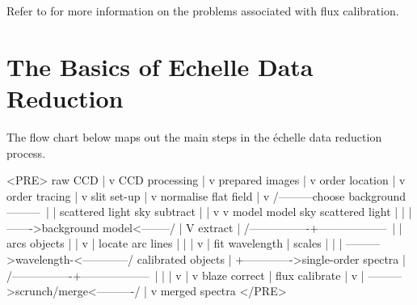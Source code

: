 Refer to  for more information on the problems associated with
flux calibration.

\section{\label{se_basics}The Basics of Echelle Data Reduction}

\begin{htmlonly}
The flow chart below maps out the main steps in the
\'{e}chelle data reduction process.
\begin{rawhtml}
<PRE>
                     raw CCD
                        |
                        v
                  CCD  processing
                        |
                        v
                  prepared images
                        |
                        v
                  order  location
                        |
                        v
                   order tracing
                        |
                        v
                    slit set-up
                        |
                        v
                     normalise
                    flat  field
                        |
                        v
       /---------choose background---------\
       |                                   |
scattered light                      sky  subtract
       |                                   |
       v                                   v
     model                             model sky
scattered light                            |
       |                                   |
       \-------->background  model<--------/
                        |
                        V
                     extract
                        |
       /----------------+------------------\
       |                                   |
      arcs                              objects
       |                                   |
       v                                   |
locate arc lines                           |
       |                                   |
       v                                   |
 fit wavelength                            |
     scales                                |
       |                                   |
       \---------->wavelength-<------------/
               calibrated  objects
                        |
                        +------------->single-order spectra
                        |
       /----------------+------------------\
       |                |                  |
       v                |                  v
 blaze correct          |           flux calibrate
       |                v                  |
       \---------->scrunch/merge<----------/
                        |
                        v
                  merged spectra
</PRE>
\end{rawhtml}
\end{htmlonly}


